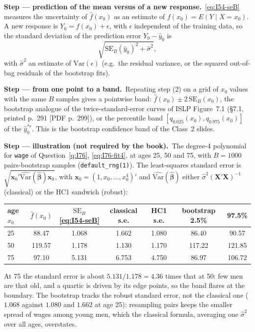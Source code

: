 \documentclass[11pt,a4paper]{article}
\numberwithin{equation}{questao}   %
\newcommand{\passo}[2]{\par\smallskip\noindent\textbf{Step --- #1.}~#2}
\begin{document}
\begin{sol}
\passo{prediction of the mean versus of a new response}{\eqref{eq:I54-seB} measures the uncertainty
of $\hat f(x_0)$ as an estimate of $f(x_0)=E(Y\mid X=x_0)$. A new response is $Y_0=f(x_0)+\epsilon$,
with $\epsilon$ independent of the training data, so the standard deviation of the prediction error
$Y_0-\hat y_0$ is
\begin{equation}\label{eq:I54-pred}
\sqrt{\mathrm{SE}_B(\hat y_0)^2+\hat\sigma^2},
\end{equation}
with $\hat\sigma^2$ an estimate of $\mathrm{Var}(\epsilon)$ (e.g.\ the residual variance, or the
squared out-of-bag residuals of the bootstrap fits).}

\passo{from one point to a band}{Repeating step (2) on a grid of $x_0$ values with the same $B$
samples gives a pointwise band: $\hat f(x_0)\pm2\,\mathrm{SE}_B(x_0)$, the bootstrap analogue of the
twice-standard-error curves of ISLP Figure~7.1 (§7.1, printed p.~291 [PDF p.~299]), or the percentile band
$[q_{0.025}(x_0),q_{0.975}(x_0)]$ of the $\hat y_0^{*r}$. This is the bootstrap confidence band of the
Class~2 slides.}

\passo{illustration (not required by the book)}{The degree-4 polynomial for \texttt{wage} of
Question~\ref{q:I76}, \eqref{eq:I76-fit4}, at ages 25, 50 and 75, with $B=1000$ pairs-bootstrap samples
(\texttt{default\_rng(1)}). The least-squares standard error is
$\sqrt{\mathbf x_0'\widehat{\mathrm{Var}}(\hat{\boldsymbol\beta})\mathbf x_0}$, with
$\mathbf x_0=(1,x_0,\dots,x_0^4)'$ and $\widehat{\mathrm{Var}}(\hat{\boldsymbol\beta})$ either
$\hat\sigma^2(\mathbf X'\mathbf X)^{-1}$ (classical) or the HC1 sandwich (robust):
\begin{center}\small\begin{tabular}{lcccccc}\toprule
age $x_0$ & $\hat f(x_0)$ & $\mathrm{SE}_B$ \eqref{eq:I54-seB} & classical s.e. & HC1 s.e. & bootstrap 2.5\% & 97.5\%\\\midrule
25 & 88.47 & 1.068 & 1.662 & 1.080 & 86.40 & 90.57\\
50 & 119.57 & 1.178 & 1.130 & 1.170 & 117.22 & 121.85\\
75 & 97.10 & 5.131 & 6.753 & 4.750 & 86.97 & 106.72\\\bottomrule\end{tabular}\end{center}
At 75 the standard error is about $5.131/1.178=4.36$ times that at 50: few men are that old, and a
quartic is driven by its edge points, so the band flares at the boundary. The bootstrap tracks the
robust standard error, not the classical one ($1.068$ against $1.080$ and $1.662$ at age 25): resampling
pairs keeps the smaller spread of wages among young men, which the classical formula, averaging one
$\hat\sigma^2$ over all ages, overstates.}


\end{sol}
\end{document}
